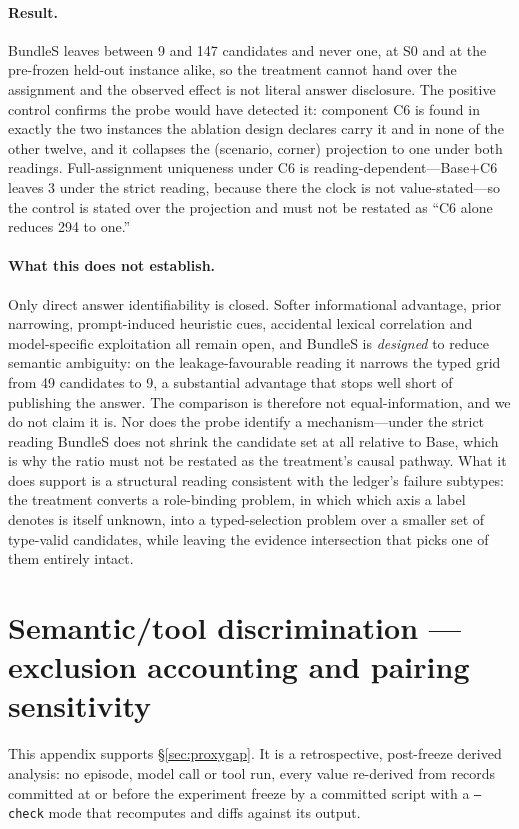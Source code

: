 \documentclass{article}
\begin{document}
\paragraph{Result.} BundleS leaves between 9 and 147 candidates and never one, at S0 and at the pre-frozen held-out instance alike, so the treatment cannot hand over the assignment and the observed effect is not literal answer disclosure. The positive control confirms the probe would have detected it: component C6 is found in exactly the two instances the ablation design declares carry it and in none of the other twelve, and it collapses the (scenario, corner) projection to one under both readings. Full-assignment uniqueness under C6 is reading-dependent---Base$+$C6 leaves 3 under the strict reading, because there the clock is not value-stated---so the control is stated over the projection and must not be restated as ``C6 alone reduces 294 to one.''

\paragraph{What this does not establish.} Only direct answer identifiability is closed. Softer informational advantage, prior narrowing, prompt-induced heuristic cues, accidental lexical correlation and model-specific exploitation all remain open, and BundleS is \emph{designed} to reduce semantic ambiguity: on the leakage-favourable reading it narrows the typed grid from 49 candidates to 9, a substantial advantage that stops well short of publishing the answer. The comparison is therefore not equal-information, and we do not claim it is. Nor does the probe identify a mechanism---under the strict reading BundleS does not shrink the candidate set at all relative to Base, which is why the ratio must not be restated as the treatment's causal pathway. What it does support is a structural reading consistent with the ledger's failure subtypes: the treatment converts a role-binding problem, in which which axis a label denotes is itself unknown, into a typed-selection problem over a smaller set of type-valid candidates, while leaving the evidence intersection that picks one of them entirely intact.

\section{Semantic/tool discrimination --- exclusion accounting and pairing sensitivity}
\label{app:proxygap}
This appendix supports \S\ref{sec:proxygap}. It is a retrospective, post-freeze derived analysis: no episode, model call or tool run, every value re-derived from records committed at or before the experiment freeze by a committed script with a \texttt{--check} mode that recomputes and diffs against its output.
\end{document}
